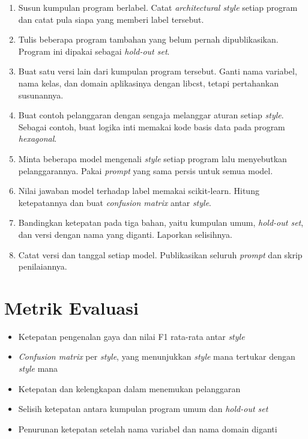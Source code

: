 \documentclass[11pt,a4paper]{article}
\begin{document}
\begin{enumerate}[leftmargin=*]
  \item Susun kumpulan program berlabel. Catat \textit{architectural style} setiap program dan catat pula siapa yang memberi label tersebut.
  \item Tulis beberapa program tambahan yang belum pernah dipublikasikan. Program ini dipakai sebagai \textit{hold-out set}.
  \item Buat satu versi lain dari kumpulan program tersebut. Ganti nama variabel, nama kelas, dan domain aplikasinya dengan libcst, tetapi pertahankan susunannya.
  \item Buat contoh pelanggaran dengan sengaja melanggar aturan setiap \textit{style}. Sebagai contoh, buat logika inti memakai kode basis data pada program \textit{hexagonal}.
  \item Minta beberapa model mengenali \textit{style} setiap program lalu menyebutkan pelanggarannya. Pakai \textit{prompt} yang sama persis untuk semua model.
  \item Nilai jawaban model terhadap label memakai scikit-learn. Hitung ketepatannya dan buat \textit{confusion matrix} antar \textit{style}.
  \item Bandingkan ketepatan pada tiga bahan, yaitu kumpulan umum, \textit{hold-out set}, dan versi dengan nama yang diganti. Laporkan selisihnya.
  \item Catat versi dan tanggal setiap model. Publikasikan seluruh \textit{prompt} dan skrip penilaiannya.
\end{enumerate}

\section{Metrik Evaluasi}

\begin{itemize}[leftmargin=*]
  \item Ketepatan pengenalan gaya dan nilai F1 rata-rata antar \textit{style}
  \item \textit{Confusion matrix} per \textit{style}, yang menunjukkan \textit{style} mana tertukar dengan \textit{style} mana
  \item Ketepatan dan kelengkapan dalam menemukan pelanggaran
  \item Selisih ketepatan antara kumpulan program umum dan \textit{hold-out set}
  \item Penurunan ketepatan setelah nama variabel dan nama domain diganti
\end{itemize}



\end{document}
